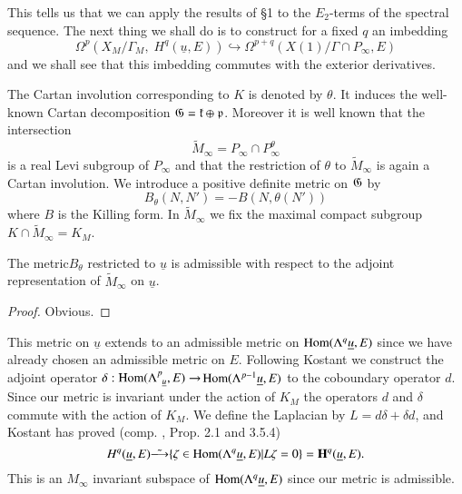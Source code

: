 This tells us that we can apply the results of \S1 to the $E_2$-terms of the spectral sequence. The next thing we shall do is to construct for a fixed $q$ an imbedding
$$
\Omega^p (X_M / \Gamma_M, \; H^q (\underline{u}, E)) \hookrightarrow \Omega^{p+q} (X (1) / \Gamma \cap P_\infty, E)
$$
and we shall see that this imbedding commutes with the exterior derivatives.

The Cartan involution corresponding to $K$ is denoted by $\theta$. It induces the well-known Cartan decomposition $\mathfrak{G} = \mathfrak{k} \oplus \mathfrak{p}$. Moreover it is well known that the intersection
$$
\tilde{M}_\infty = P_\infty \cap P^\theta_\infty
$$
is a real Levi subgroup of $P_\infty$ and that the restriction of $\theta$ to $\tilde{M}_\infty$ is again a Cartan involution. We introduce a positive definite metric on $\mathfrak{G}$ by
$$
B_\theta (N , N') = - B (N, \theta (N'))
$$
where $B$ is the Killing form. In $\tilde{M}_\infty$ we fix the maximal compact subgroup $K \cap \tilde{M}_\infty = K_M$.

\setcounter{lemma}{3}
\begin{lemma}\label{art5-lem2.4}
The metric\pageoriginale $B_\theta$ restricted to $\underline{u}$ is admissible with respect to the adjoint representation of $\tilde{M}_\infty$ on $\underline{u}$.
\end{lemma}

\begin{proof}
Obvious.
\end{proof}

This metric on $\underline{u}$ extends to an admissible metric on $\operatorname{Hom} (\Lambda^q \underline{u}, E)$ since we have already chosen an admissible metric on $E$. Following Kostant \cite{art5-key9} we construct the adjoint operator $\delta : \operatorname{Hom} (\Lambda^p_{\;\;\underline{u}} , E ) \to$\break $\operatorname{Hom} (\Lambda^{p-1} \underline{u}, E)$ to the coboundary operator $d$. Since our metric is invariant under the action of $K_M$ the operators $d$ and $\delta$ commute with the action of $K_M$. We define the Laplacian by $L = d \delta + \delta d$, and Kostant has proved (comp. \cite{art5-key9}, Prop. 2.1 and 3.5.4)
$$
H^q (\underline{u}, E) \tilde{\longrightarrow} \{\zeta \in \operatorname{Hom} (\Lambda^q \underline{u}, E) | L \zeta = 0\} = \mathbf{H}^q (\underline{u}, E).
$$
This is an $M_\infty$ invariant subspace of $\operatorname{Hom} (\Lambda^q \underline{u}, E)$ since our metric is admissible.

